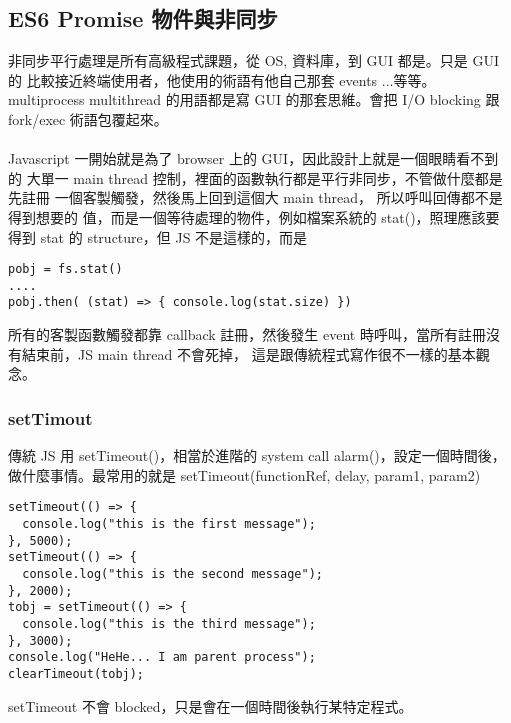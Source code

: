   \subsection{ES6 Promise 物件與非同步}
  非同步平行處理是所有高級程式課題，從 OS, 資料庫，到 GUI 都是。只是 GUI 的
  比較接近終端使用者，他使用的術語有他自己那套 events ...等等。 multiprocess
  multithread 的用語都是寫 GUI 的那套思維。會把 I/O blocking 跟 fork/exec
  術語包覆起來。
  \\\\
  Javascript 一開始就是為了 browser 上的 GUI，因此設計上就是一個眼睛看不到的
  大單一 main thread 控制，裡面的函數執行都是平行非同步，不管做什麼都是先註冊
  一個客製觸發，然後馬上回到這個大 main thread， 所以呼叫回傳都不是得到想要的
  值，而是一個等待處理的物件，例如檔案系統的 stat()，照理應該要得到 stat 的
  structure，但 JS 不是這樣的，而是
  \begin{verbatim}
pobj = fs.stat()
....
pobj.then( (stat) => { console.log(stat.size) })
  \end{verbatim}
  所有的客製函數觸發都靠
  callback 註冊，然後發生 event 時呼叫，當所有註冊沒有結束前，JS main thread
  不會死掉， 這是跟傳統程式寫作很不一樣的基本觀念。

  \subsubsection{setTimout}
  傳統 JS 用 setTimeout()，相當於進階的 system call alarm()，設定一個時間後，
  做什麼事情。最常用的就是 setTimeout(functionRef, delay, param1, param2)
  \begin{verbatim}
setTimeout(() => {
  console.log("this is the first message");
}, 5000);
setTimeout(() => {
  console.log("this is the second message");
}, 2000);
tobj = setTimeout(() => {
  console.log("this is the third message");
}, 3000);
console.log("HeHe... I am parent process");
clearTimeout(tobj);
  \end{verbatim}
  setTimeout 不會 blocked，只是會在一個時間後執行某特定程式。

